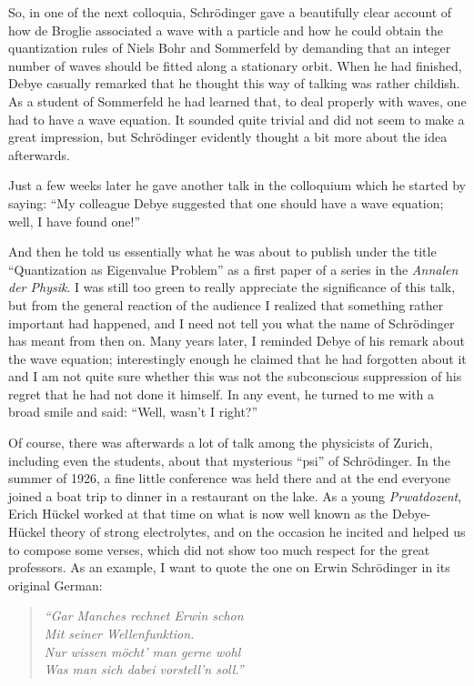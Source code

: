 \documentclass[12pt]{article}
\begin{document}
So, in one of the next colloquia, Schr\"odinger gave a beautifully clear account of how de Broglie associated a wave with a particle and how he could obtain the quantization rules of Niels Bohr and Sommerfeld by demanding that an integer number of waves should be fitted along a stationary orbit. When he had finished, Debye casually remarked that he thought this way of talking was rather childish. As a student of Sommerfeld he had learned that, to deal properly with waves, one had to have a wave equation. It sounded quite trivial and did not seem to make a great impression, but Schr\"odinger evidently thought a bit more about the idea afterwards.

Just a few weeks later he gave another
talk in the colloquium which he started by saying: ``My colleague Debye suggested that one should have a wave equation; well, I have found one!''

And then he told us essentially what he was about to publish under the title ``Quantization as Eigenvalue Problem'' as a first paper of a series in the {\it Annalen der Physik}. I was still too green to really appreciate the significance of this talk, but from the general reaction of the audience I realized that something rather important had happened, and I need not tell you what the name of Schr\"odinger has meant from then on. Many years later, I reminded Debye of his remark about the wave equation; interestingly enough he claimed that he had forgotten about it and I am not quite sure whether this was not the subconscious suppression of his regret that he had not done it himself. In any event, he turned to me with a broad smile and said: ``Well, wasn't I right?''

Of course, there was afterwards a lot of talk among the physicists of Zurich, including even the students, about that mysterious ``psi'' of Schr\"odinger. In the summer of 1926, a fine little conference was held there and at the end everyone
joined a boat trip to dinner in a restaurant on the lake. As a young {\it Prwatdozent}, Erich H\"uckel worked at that time on what is now well known as the Debye-H\"uckel theory of strong electrolytes, and on the occasion he incited and helped us to compose some verses, which did not show too much respect for the great professors. As an example, I want to quote the one on Erwin Schr\"odinger in its original German:

\begin{quote}
\it
``Gar Manches rechnet Erwin schon\\
Mit seiner Wellenfunktion.\\
Nur wissen m\"ocht' man gerne wohl\\
Was man sich dabei vorstell'n soll.''
\end{quote}
\end{document}
